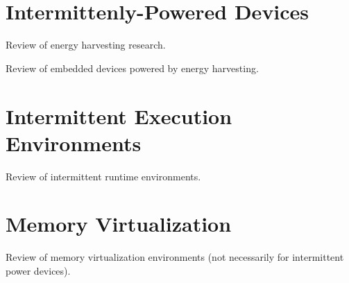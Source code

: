 \section{Intermittenly-Powered Devices}
\label{sec:relatedwork_intermittent_power_devices}

Review of energy harvesting research.

Review of embedded devices powered by energy harvesting.


\section{Intermittent Execution Environments}
\label{sec:relatedwork_intermittent_execution}

Review of intermittent runtime environments.


\section{Memory Virtualization}
\label{sec:relatedwork_memory_virtualization}

Review of memory virtualization environments (not necessarily for intermittent power devices).

